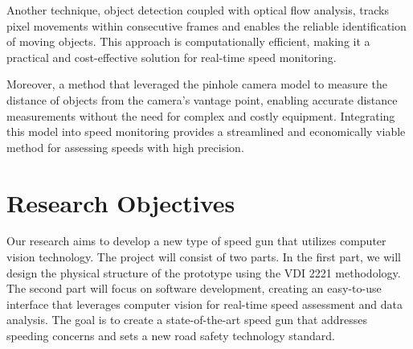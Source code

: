 Another technique, object detection coupled with optical flow analysis, tracks pixel movements within consecutive frames and enables the reliable identification of moving objects. This approach is computationally efficient, making it a practical and cost-effective solution for real-time speed monitoring.

Moreover, a method that leveraged the pinhole camera model to measure the distance of objects from the camera's vantage point, enabling accurate distance measurements without the need for complex and costly equipment. Integrating this model into speed monitoring provides a streamlined and economically viable method for assessing speeds with high precision.

\section{Research Objectives}

Our research aims to develop a new type of speed gun that utilizes computer vision technology. The project will consist of two parts. In the first part, we will design the physical structure of the prototype using the VDI 2221 methodology. The second part will focus on software development, creating an easy-to-use interface that leverages computer vision for real-time speed assessment and data analysis. The goal is to create a state-of-the-art speed gun that addresses speeding concerns and sets a new road safety technology standard.

